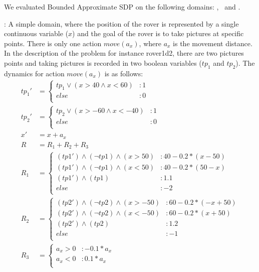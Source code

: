 \label{sec:empirical}

We evaluated Bounded Approximate SDP on the following domains:
\MarsRoverUni, \MarsRoverBi ~and \Invent.

\MarsRoverUni:
A simple domain, where the position of the rover is represented by a single continuous variable ($x$) and the goal of the rover is to take pictures at specific points. There is only one action $ move(a_x)$, where $a_x$ is the movement distance. In the description of the problem for instance rover1d2, there are two pictures points and taking pictures is recorded in two boolean variables ($tp_1$ and $tp_2$). The dynamics for action $move(a_x)$ is as follows:
{\footnotesize
\begin{align*}
tp_1' &= \begin{cases}
tp_1 \vee (x>40 \wedge x<60)&: 1\\
else&: 0\\
\end{cases}\\
tp_2' &= \begin{cases}
tp_2 \vee (x>-60 \wedge x<-40)&: 1\\
else&: 0\\
\end{cases}\\
x' &=  x +a_x\\
R & = R_1 + R_2 + R_3\\
R_1 & = \begin{cases} 
(tp1') \wedge (\neg tp1) \wedge (x > 50) &: 40 - 0.2*(x -50)\\
(tp1') \wedge (\neg tp1) \wedge (x < 50) &: 40 - 0.2*(50-x)\\
(tp1') \wedge ( tp1) &:  1.1\\
else &: -2\\
\end{cases} \\
R_2 & = \begin{cases} 
(tp2') \wedge (\neg tp2) \wedge (x > -50) &: 60 - 0.2*(-x +50)\\
(tp2') \wedge (\neg tp2) \wedge (x < -50) &: 60 - 0.2*(x +50)\\
(tp2') \wedge ( tp2) &:  1.2\\
else &: -1\\
\end{cases} \\
R_3 & = \begin{cases} 
a_x > 0 &: -0.1*a_x\\
a_x < 0 &: 0.1*a_x\\
\end{cases} \\
\end{align*} }


